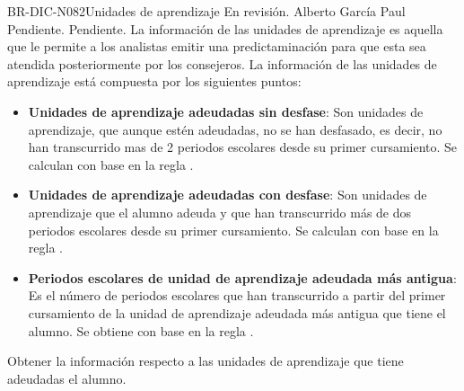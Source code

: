 \begin{BusinessRule}{BR-DIC-N082}{Unidades de aprendizaje}
	{\bcCondition} %
	{\btTimer}     %
	{\blInfluencing}     %
	\BRItem[Estado] En revisión.
	 Alberto García Paul
	 Pendiente.
	 Pendiente.
	\BRItem[Descripción] La información de las unidades de aprendizaje es aquella que le permite a los analistas emitir una predictaminación para que esta sea atendida posteriormente por los consejeros. La información de las unidades de aprendizaje está compuesta por los siguientes puntos:
	\begin{itemize}
		\item \textbf{Unidades de aprendizaje adeudadas sin desfase}: Son unidades de aprendizaje, que aunque estén adeudadas, no se han desfasado, es decir, no han transcurrido mas de 2 periodos escolares desde su primer cursamiento. Se calculan con base en la regla .
		\item \textbf{Unidades de aprendizaje adeudadas con desfase}: Son unidades de aprendizaje que el alumno adeuda y que han transcurrido más de dos periodos escolares desde su primer cursamiento. Se calculan con base en la regla .
		\item \textbf{Periodos escolares de unidad de aprendizaje adeudada más antigua}: Es el número de periodos escolares que han transcurrido a partir del primer cursamiento de la unidad de aprendizaje adeudada más antigua que tiene el alumno. Se obtiene con base en la regla .
	\end{itemize}
	\BRItem[Motivación] Obtener la información respecto a las unidades de aprendizaje que tiene adeudadas el alumno.
\end{BusinessRule}

